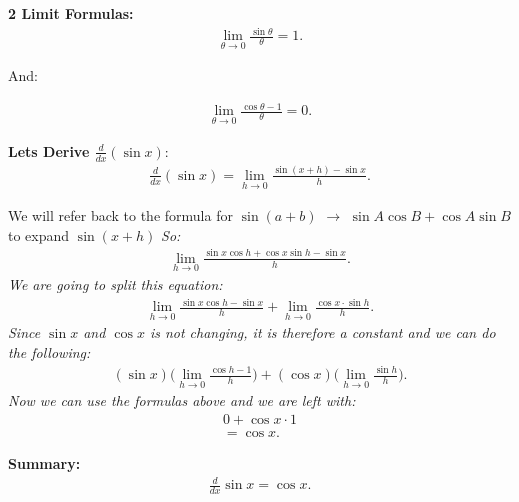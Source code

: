 \documentclass{report}
\begin{document}
  \bigbreak \noindent 
  \begin{mdframed}
    \textbf{2 Limit Formulas:}
    \begin{align*}
      \lim_{\theta \to 0}{ \frac{\sin{\theta}}{\theta}} = 1
    .\end{align*}
    \bigbreak \noindent 
    \begin{center}
      And:
    \end{center}
    \begin{align*}
      \lim_{\theta \to 0}{ \frac{\cos{\theta} -1} {\theta}} = 0
    .\end{align*}
  \end{mdframed}
  \bigbreak \noindent 
 \begin{mdframed}
   \textbf{Lets Derive $ \frac{d}{dx}(\sin{x})$}:
   \begin{align*}
     \frac{d}{dx}(\sin{x}) = \lim_{h \to 0}{ \frac{\sin(x+h) - \sin{x}}{h}}
   .\end{align*}
 \end{mdframed} 
 \bigbreak \noindent 
 We will refer back to the formula for $\sin{(a+b)}$ $\rightarrow$ $ \sin{A} \cos{B} + \cos{A} \sin{B} $ to expand $ \sin{(x+h)}$
 \bigbreak \noindent 
  \textit{So:}
  \begin{align*}
    \lim_{h \to 0}{ \frac{ \sin{x} \cos{h} + \cos{x} \sin{h} - \sin{x}}{h}} 
  .\end{align*}
  \bigbreak \noindent 
  \textit{We are going to split this equation:}
  \begin{align*}
    \lim_{h \to 0}{ \frac{ \sin{x} \cos{h} - \sin{x}}{h}} + \lim_{h \to 0}{ \frac{ \cos{x} \cdot \sin{h}}{h}}
  .\end{align*}
  \bigbreak \noindent 
  \textit{Since $ \sin{x}$ and $ \cos{x}$ is not changing, it is therefore a constant and we can do the following:}
  \begin{align*}
  (\sin{x}) \bigg(\lim_{h \to 0}{ \frac{ \cos{h}-1}{h}}\bigg) + (\cos{x}) \bigg( \lim_{h \to 0}{ \frac{\sin{h}}{h}}\bigg)
  .\end{align*}
  \bigbreak \noindent 
  \textit{Now we can use the formulas above and we are left with:}
  \begin{align*}
   0 + \cos{x} \cdot 1 \\
   = \cos{x}
  .\end{align*}
  \bigbreak \noindent 
  \begin{mdframed}
    \textbf{Summary:}
    \begin{align*}
      \frac{d}{dx} \sin{x} = \cos{x}
    .\end{align*}
  \end{mdframed}
\end{document}
